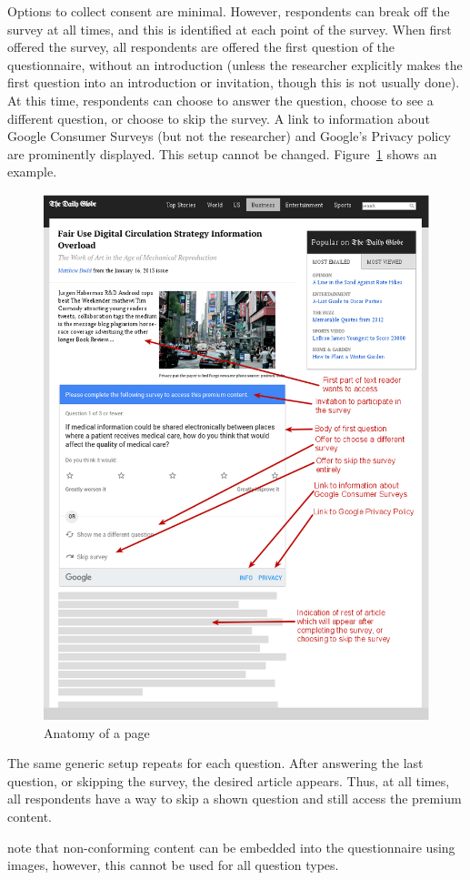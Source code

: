 Options to collect consent are minimal. However, respondents can break off the survey at all times, and this is identified at each point of the survey. When first offered the survey, all respondents are offered the first question of the questionnaire, without an introduction (unless the researcher explicitly makes the first question into an introduction or invitation, though this is not usually done). At this time, respondents can choose to answer the question, choose to see a different question, or choose to skip the survey. A link to information about Google Consumer Surveys (but not the researcher) and Google's Privacy policy are prominently displayed. This setup cannot be changed. Figure~\ref{fig:anatomy} shows an example. 
\begin{figure}
	\includegraphics[width=\textwidth]{Selection_359.png}
	\caption{\label{fig:anatomy}Anatomy of a page}
\end{figure}
The same generic setup repeats for each question. After answering the last question, or skipping the survey, the desired article appears. Thus, at all times, all respondents have a way to skip a shown question and still access the premium content.

\cite{doi:10.1093/pan/mpw016} note that non-conforming content can be embedded into the questionnaire using images, however, this cannot be used for all question types.